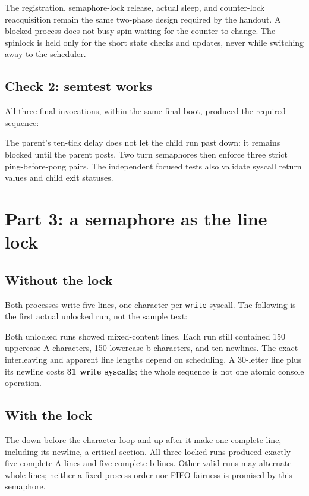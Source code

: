 \documentclass[12pt]{article}
\begin{document}
The registration, semaphore-lock release, actual sleep, and counter-lock
reacquisition remain the same two-phase design required by the handout.
A blocked process does not busy-spin waiting for the counter to change.
The spinlock is held only for the short state checks and updates, never
while switching away to the scheduler.

\subsection{Check 2: semtest works}
All three final invocations, within the same final boot, produced the
required sequence:

The parent's ten-tick delay does not let the child run past down: it
remains blocked until the parent posts. Two turn semaphores then enforce
three strict ping-before-pong pairs. The independent focused tests also
validate syscall return values and child exit statuses.

\clearpage
\section{Part 3: a semaphore as the line lock}
\subsection{Without the lock}
Both processes write five lines, one character per \texttt{write} syscall.
The following is the first actual unlocked run, not the sample text:

Both unlocked runs showed mixed-content lines. Each run still contained
150 uppercase A characters, 150 lowercase b characters, and ten newlines.
The exact interleaving and apparent line lengths depend on scheduling.
A 30-letter line plus its newline costs \textbf{31 write syscalls}; the
whole sequence is not one atomic console operation.

\subsection{With the lock}

The down before the character loop and up after it make one complete
line, including its newline, a critical section. All three locked runs
produced exactly five complete A lines and five complete b lines. Other
valid runs may alternate whole lines; neither a fixed process order nor
FIFO fairness is promised by this semaphore.
\end{document}
